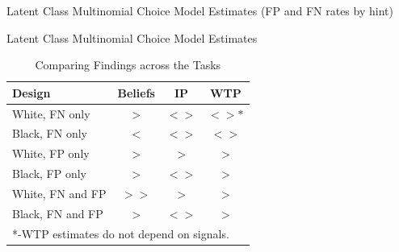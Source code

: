 \documentclass[11pt,a4paper]{article}
\begin{document}
\newpage
%

\newpage

\begin{table}[H]
\caption{Latent Class Multinomial Choice Model Estimates (FP and FN rates by hint)}

\end{table}







\newpage
%

\begin{table}[H]
\caption{Latent Class Multinomial Choice Model Estimates}

\end{table}

%

%





%


%







\begin{table}[H]\centering
\caption{Comparing Findings across the Tasks}
\begin{tabular}{l|c|c|c}
\hline \hline
Design & Beliefs & IP &WTP\\
\hline
White, FN only & $>$ & $<>$ & $<>*$ \\
Black, FN only & $<$ & $<>$ & $<>$ \\
White, FP only & $>$ & $>$ & $>$ \\
Black, FP only & $>$ & $<>$ & $>$ \\
White, FN and FP & $>>$ & $>$ & $>$ \\
Black, FN and FP & $>$ & $<>$ & $>$\\
\hline
\multicolumn{4}{l}{*-WTP estimates do not depend on signals.}\\
\end{tabular}
\end{table}
\end{document}
